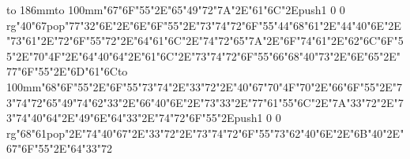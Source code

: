 \hbox to 186mm{\hsize=81mm\vbox to 100mm{\vfill\ipa\char"67\ipa\char"6F\ipa\char"55\ipa\char"2E\ipa\char"65\ipa\char"49\ipa\char"72\ipa\char"7A\ipa\char"2E\ipa\char"61\ipa\char"6C\ipa\char"2E\pdfcolorstack\match push{1 0 0 rg}\ipa\char"40\ipa\char"67\pdfcolorstack\match pop{}\medskip\ipa\char"77\ipa\char"32\ipa\char"6E\ipa\char"2E\ipa\char"6E\ipa\char"6F\ipa\char"55\ipa\char"2E\ipa\char"73\ipa\char"74\ipa\char"72\ipa\char"6F\ipa\char"55\ipa\char"44\medskip\ipa\char"68\ipa\char"61\ipa\char"2E\ipa\char"44\ipa\char"40\ipa\char"6E\ipa\char"2E\ipa\char"73\ipa\char"61\ipa\char"2E\ipa\char"72\ipa\char"6F\ipa\char"55\ipa\char"72\ipa\char"2E\ipa\char"64\ipa\char"61\ipa\char"6C\ipa\char"2E\ipa\char"74\ipa\char"72\ipa\char"65\ipa\char"7A\ipa\char"2E\ipa\char"6F\ipa\char"74\medskip\ipa\char"61\ipa\char"2E\ipa\char"62\ipa\char"6C\ipa\char"6F\ipa\char"55\ipa\char"2E\ipa\char"70\ipa\char"4F\ipa\char"2E\ipa\char"64\ipa\char"40\ipa\char"64\ipa\char"2E\ipa\char"61\ipa\char"6C\ipa\char"2E\ipa\char"73\ipa\char"74\ipa\char"72\ipa\char"6F\ipa\char"55\ipa\char"66\medskip\ipa\char"68\ipa\char"40\ipa\char"73\ipa\char"2E\ipa\char"6E\ipa\char"65\ipa\char"2E\ipa\char"77\ipa\char"6F\ipa\char"55\ipa\char"2E\ipa\char"6D\ipa\char"61\ipa\char"6C\vfill}\hfill\vbox to 100mm{\vfill\ipa\char"68\ipa\char"6F\ipa\char"55\ipa\char"2E\ipa\char"6F\ipa\char"55\ipa\char"73\ipa\char"74\ipa\char"2E\ipa\char"33\ipa\char"72\ipa\char"2E\ipa\char"40\ipa\char"67\medskip\ipa\char"70\ipa\char"4F\ipa\char"70\ipa\char"2E\ipa\char"66\ipa\char"6F\ipa\char"55\ipa\char"2E\ipa\char"73\ipa\char"74\ipa\char"72\ipa\char"65\ipa\char"49\ipa\char"74\medskip\ipa\char"62\ipa\char"33\ipa\char"2E\ipa\char"66\ipa\char"40\ipa\char"6E\ipa\char"2E\ipa\char"73\ipa\char"33\ipa\char"2E\ipa\char"77\ipa\char"61\ipa\char"55\ipa\char"6C\ipa\char"2E\ipa\char"7A\ipa\char"33\ipa\char"72\ipa\char"2E\ipa\char"73\ipa\char"74\ipa\char"40\ipa\char"64\ipa\char"2E\ipa\char"49\ipa\char"6E\ipa\char"64\medskip\ipa\char"33\ipa\char"2E\ipa\char"74\ipa\char"72\ipa\char"6F\ipa\char"55\ipa\char"2E\pdfcolorstack\match push{1 0 0 rg}\ipa\char"68\ipa\char"61\pdfcolorstack\match pop{}\ipa\char"2E\ipa\char"74\ipa\char"40\ipa\char"67\ipa\char"2E\ipa\char"33\ipa\char"72\ipa\char"2E\ipa\char"73\ipa\char"74\ipa\char"72\ipa\char"6F\ipa\char"55\ipa\char"73\medskip\ipa\char"62\ipa\char"40\ipa\char"6E\ipa\char"2E\ipa\char"6B\ipa\char"40\ipa\char"2E\ipa\char"67\ipa\char"6F\ipa\char"55\ipa\char"2E\ipa\char"64\ipa\char"33\ipa\char"72\vfill}}\eject
